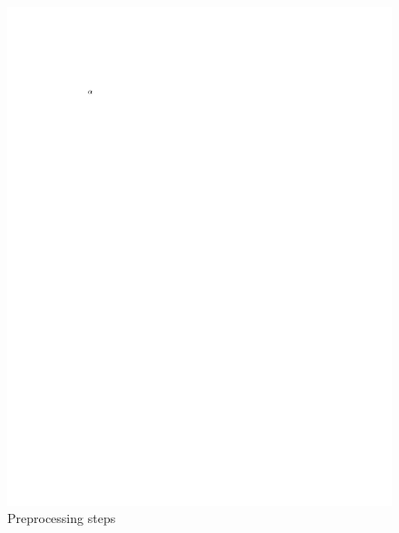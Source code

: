 \documentclass[a4paper,12pt,sort&compress]{article}
\begin{document}
    \begin{figure}
        \centering
        \includegraphics[width=0.6\linewidth]{a.pdf}
        \caption{Preprocessing steps}
        \label{fig:preprocessing_steps}
    \end{figure}
\end{document}
